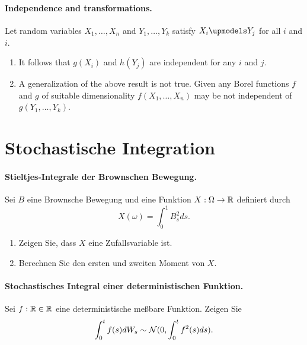 \paragraph{Independence and transformations. } Let random variables
$X_1,\ldots,X_n$ and $Y_1,\ldots,Y_k$ satisfy $X_i \upmodels Y_j$ for all $i$
and $i$.
\begin{enumerate}
    \item It follows that $g(X_i)$ and $h(Y_j)$ are independent for any $i$ and
        $j$.
    \item A generalization of the above result is not true. Given any Borel
        functions $f$ and $g$ of suitable dimensionality $f(X_1,\ldots,X_n)$
        may be not independent of $g(Y_1,\ldots,Y_k)$.
\end{enumerate}



\section{Stochastische Integration}

\paragraph{Stieltjes-Integrale der Brownschen Bewegung.} 
Sei $B$ eine Brownsche Bewegung und eine Funktion $X:\Omega\to\mathbb R$ definiert durch
\begin{equation*}
    X(\omega) = \int_{0}^{1} B_s^{2} ds. 
\end{equation*}
\begin{enumerate}
    \item Zeigen Sie, dass $X$ eine Zufallsvariable ist.
    \item Berechnen Sie den ersten und zweiten Moment von $X$. 
\end{enumerate}



\paragraph{Stochastisches Integral einer deterministischen Funktion. } Sei
$f: \mathbb R\in\mathbb R$ eine deterministische meßbare Funktion. Zeigen Sie 
\begin{equation}
    \int_{0}^{t} f(s) d W_s \sim \mathcal N(0, \int_{0}^{t} f^2(s) ds). 
\end{equation}








